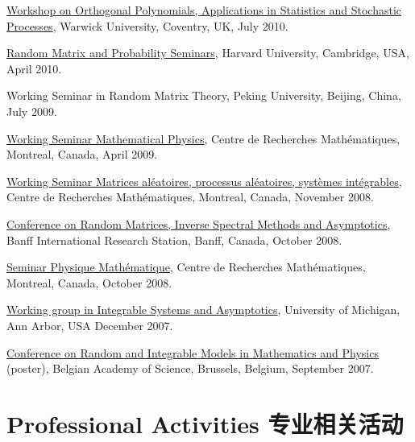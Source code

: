 \documentclass[12pt,a4paper]{article}
\newenvironment{item_list}{
 \begin{list}{}{
   \setlength{\leftmargin}{1.5em}
   \setlength{\itemsep}{0.25em}
   \setlength{\parskip}{0pt}
   \setlength{\parsep}{0.25em}
 }
}{
 \end{list}
}
\begin{document}
\begin{item_list}
  \href{http://www2.warwick.ac.uk/fac/sci/statistics/crism/workshops/orthogonal-polynomials/}{Workshop on Orthogonal Polynomials, Applications in Statistics and Stochastic Processes}, Warwick University, Coventry, UK, July 2010.
\item
  \href{http://www.math.harvard.edu/cgi-bin/showtalk.pl}{Random Matrix and Probability Seminars}, Harvard University, Cambridge, USA, April 2010.
\item
  Working Seminar in Random Matrix Theory, Peking University, Beijing, China, July 2009.
\item
  \href{http://www.crm.umontreal.ca/cal/en/mois200804.html}{Working Seminar Mathematical Physics}, Centre de Recherches Math\'{e}matiques, Montreal, Canada, April 2009.
\item
  \href{http://www.crm.umontreal.ca/cal/en/mois200811.html}{Working Seminar Matrices al\'{e}atoires, processus al\'{e}atoires, syst\`{e}mes int\'{e}grables}, Centre de Recherches Math\'{e}matiques, Montreal, Canada, November 2008.
\item
  \href{http://www.birs.ca/events/2008/5-day-workshops/08w5017}{Conference on Random Matrices, Inverse Spectral Methods and Asymptotics}, Banff International Research Station, Banff, Canada, October 2008.
\item
  \href{http://www.crm.umontreal.ca/cal/en/mois200810.html}{Seminar Physique Math\'{e}matique}, Centre de Recherches Math\'{e}matiques, Montreal, Canada, October 2008.
\item
  \href{http://www.math.lsa.umich.edu/~millerpd/WGISA_archives/WGISA_Fall_07.html}{Working group in Integrable Systems and Asymptotics}, University of Michigan, Ann Arbor, USA December 2007.
\item
  \href{http://magelhaes.hzs.be/RIMMP/}{Conference on Random and Integrable Models in Mathematics and Physics} (poster), Belgian Academy of Science, Brussels, Belgium, September 2007.
\end{item_list}

\section*{Professional Activities 专业相关活动}
\end{document}
